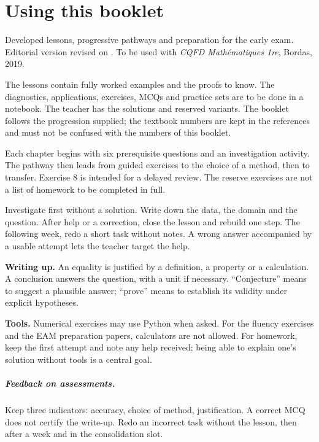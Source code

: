 \chapter*{Using this booklet}
Developed lessons, progressive pathways and preparation for the early exam. Editorial version revised on . To be used with \emph{CQFD Mathématiques 1re}, Bordas, 2019.

The lessons contain fully worked examples and the proofs to know. The diagnostics, applications, exercises, MCQs and practice sets are to be done in a notebook. The teacher has the solutions and reserved variants. The booklet follows the progression supplied; the textbook numbers are kept in the references and must not be confused with the numbers of this booklet.

Each chapter begins with six prerequisite questions and an investigation activity. The pathway then leads from guided exercises to the choice of a method, then to transfer. Exercise 8 is intended for a delayed review. The reserve exercises are not a list of homework to be completed in full.

\begin{keypoint}
Investigate first without a solution. Write down the data, the domain and the question. After help or a correction, close the lesson and rebuild one step. The following week, redo a short task without notes. A wrong answer accompanied by a usable attempt lets the teacher target the help.
\end{keypoint}

\textbf{Writing up.} An equality is justified by a definition, a property or a calculation. A conclusion answers the question, with a unit if necessary. ``Conjecture'' means to suggest a plausible answer; ``prove'' means to establish its validity under explicit hypotheses.

\textbf{Tools.} Numerical exercises may use Python when asked. For the fluency exercises and the EAM preparation papers, calculators are not allowed. For homework, keep the first attempt and note any help received; being able to explain one's solution without tools is a central goal.

\ifmxteacher\paragraph{Feedback on assessments.} Keep three indicators: accuracy, choice of method, justification. A correct MCQ does not certify the write-up. Redo an incorrect task without the lesson, then after a week and in the consolidation slot.\fi

